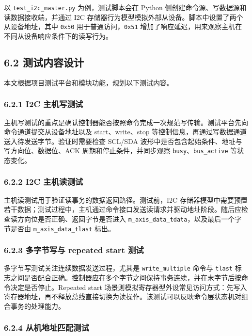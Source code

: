 以 \texttt{test\_i2c\_master.py} 为例，测试脚本会在 Python
侧创建命令源、写数据源和读数据接收端，并通过 I2C
存储器行为模型模拟外部从设备。脚本中设置了两个从设备地址，其中
\texttt{0x50} 用于普通访问，\texttt{0x51}
增加了响应延迟，用来观察主机在不同从设备响应条件下的读写行为。

\subsection{6.2
测试内容设计}\label{ux6d4bux8bd5ux5185ux5bb9ux8bbeux8ba1}

本文根据项目测试平台和模块功能，规划以下测试内容。

\subsubsection{6.2.1 I2C
主机写测试}\label{i2c-ux4e3bux673aux5199ux6d4bux8bd5}

主机写测试的重点是确认控制器能否按照命令完成一次规范写传输。测试平台先向命令通道提交从设备地址以及
start、write、stop
等控制信息，再通过写数据通道送入待发送字节。验证时需要检查 SCL/SDA
波形中是否包含起始条件、地址与写方向位、数据位、ACK
周期和停止条件，并同步观察 \texttt{busy}、\texttt{bus\_active}
等状态变化。

\subsubsection{6.2.2 I2C
主机读测试}\label{i2c-ux4e3bux673aux8bfbux6d4bux8bd5}

主机读测试用于验证读事务的数据返回路径。测试前，I2C
存储器模型中需要预置若干数据；测试过程中，主机通过命令接口发送读请求并驱动地址阶段。随后应检查读方向位是否正确、返回字节是否进入
\texttt{m\_axis\_data\_tdata}，以及最后一个字节是否由
\texttt{m\_axis\_data\_tlast} 标出。

\subsubsection{6.2.3 多字节写与 repeated start
测试}\label{ux591aux5b57ux8282ux5199ux4e0e-repeated-start-ux6d4bux8bd5}

多字节写测试关注连续数据发送过程，尤其是 \texttt{write\_multiple} 命令与
\texttt{tlast}
标志之间是否配合正确。控制器应在多个字节之间保持事务连续，并在末字节后按命令决定是否停止。Repeated
start
场景则模拟寄存器型外设常见访问方式：先写入寄存器地址，再不释放总线直接切换为读操作。该测试可以反映命令层状态机对组合事务的处理能力。

\subsubsection{6.2.4
从机地址匹配测试}\label{ux4eceux673aux5730ux5740ux5339ux914dux6d4bux8bd5}

